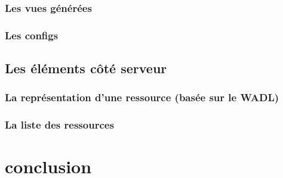 \documentclass[a4paper,11pt]{report}
\begin{document}
\subsection{Les vues générées}
\subsection{Les configs}
\section{Les éléments côté serveur}
\subsection{La représentation d'une ressource (basée sur le WADL) }
\subsection{La liste des ressources}
\chapter{conclusion}
\end{document}
